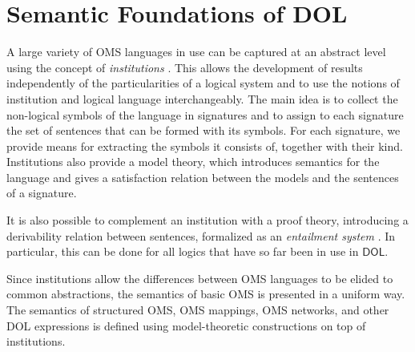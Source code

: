 \documentclass[10pt,fleqn,%
\ifpretendfinal
final%
\else
draft%
\fi,
]{scrreprt}
\newcommand*{\DOL}{\ensuremath{\mathsf{DOL}}\xspace}
\begin{document}


\section{Semantic Foundations of DOL}\label{sem-foundations}


A large variety of OMS languages in use can be captured at an abstract level using the concept of 
\emph{institutions} \cite{GoguenBurstall92}.
This allows the development of results independently of the particularities of a logical system and to use the notions of institution and  logical language interchangeably. 
The main idea is to collect the non-logical
symbols of the language in signatures and to assign to each signature the set of sentences that can be formed with its symbols. 
For each signature, we provide means for extracting the symbols it consists of, together with their kind.
Institutions also provide a model theory, which introduces semantics for
the language and gives a satisfaction relation between the models and
the sentences of a signature.   

It is also possible to complement an institution with a proof theory,
introducing a derivability relation between sentences, formalized as 
an \emph{entailment system} \cite{Meseguer89}. In particular, this
can be done for all logics that have so far been in use in \DOL.


Since institutions allow the differences between OMS languages to be elided to common abstractions, 
the semantics of basic OMS is presented in a uniform way.  The semantics of structured OMS, 
OMS mappings, OMS networks, and other DOL expressions is defined using model-theoretic constructions
on top of institutions. 
\end{document}
